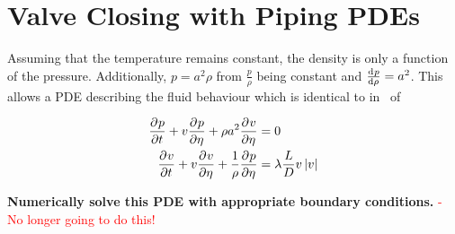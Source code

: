 \section{Valve Closing with Piping PDEs} \label{sec: PDE}

Assuming that the temperature remains constant, the density is only a function of the pressure. Additionally, $p = a^2 \rho$ from $\frac{p}{\rho}$ being constant and $\diff{p}{\rho} = a^2$. This allows a PDE describing the fluid behaviour which is identical to in~\cite{Hos2015ModelPipe} of

\begin{equation*}
\begin{split}
    \pdiff{p}{t} + v \pdiff{p}{\eta} + \rho a^2 \pdiff{v}{\eta} &= 0 \\
    \pdiff{v}{t} + v \pdiff{v}{\eta} + \frac{1}{\rho} \pdiff{p}{\eta} &= \lambda \frac{L}{D} v \left| v \right|
\end{split}
\end{equation*}

\textbf{Numerically solve this PDE with appropriate boundary conditions.} \textcolor{Red}{- No longer going to do this!}